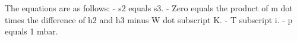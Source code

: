 The equations are as follows:
- s2 equals s3.
- Zero equals the product of m dot times the difference of h2 and h3 minus W dot subscript K.
- T subscript i.
- p equals 1 mbar.